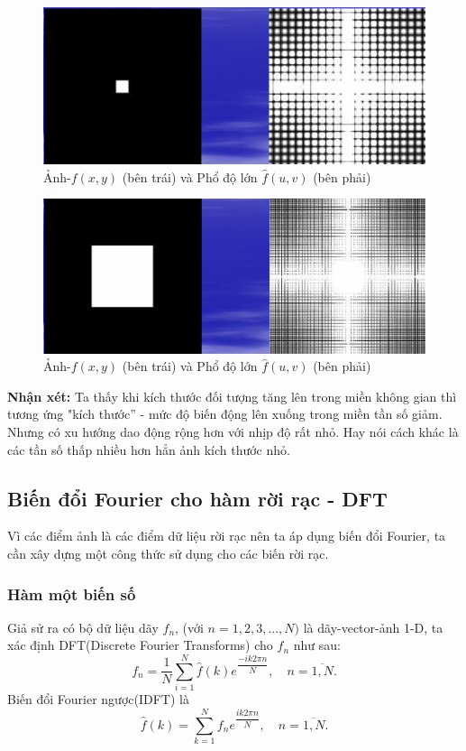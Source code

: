 \documentclass[12pt,a4paper]{report}
\numberwithin{equation}{section}
\theoremstyle{definition} %
\begin{document}
		  \begin{figure}[H]
			\centering
			\includegraphics[width = 0.8\linewidth]{img/anhVaphodolon3.png}
			\caption{Ảnh-$f(x,y)$ (bên trái) và Phổ độ lớn $\hat{f}(u,v)$ (bên phải)}
			\label{fig17}
		 \end{figure}
		  \begin{figure}[H]
			\centering
			\includegraphics[width = 0.8\linewidth]{img/anhVaphodolon4.png}
			\caption{Ảnh-$f(x,y)$ (bên trái) và Phổ độ lớn $\hat{f}(u,v)$ (bên phải)}
			\label{fig18}
		 \end{figure}

		 \textbf{Nhận xét:} Ta thấy khi kích thước đối tượng tăng lên trong miền không gian thì tương ứng "kích thước'' - mức độ biến động lên xuống trong miền tần số giảm. Nhưng có xu hướng dao động rộng hơn với nhịp độ rất nhỏ. Hay nói cách khác là các tần số thấp nhiều hơn hẳn ảnh kích thước nhỏ.


\subsection{Biến đổi Fourier cho hàm rời rạc - DFT}

Vì các điểm ảnh là các điểm dữ liệu rời rạc nên ta áp dụng biến đổi Fourier, ta cần xây dựng một công thức sử dụng cho các biến rời rạc.

\subsubsection{Hàm một biến số}

Giả sử ra có bộ dữ liệu dãy $f_n$, (với $n= 1,2,3,...,N)$ là dãy-vector-ảnh 1-D, ta xác định DFT(Discrete Fourier Transforms) cho $f_n$ như sau: 
\begin{equation}
	\label{144}
    f_n= \dfrac{1}{N}\sum_{i=1}^N\hat{f}(k)e^{\dfrac{-ik2\pi n}{N}},\quad n=\overline{1,N}.
\end{equation}
Biến đổi Fourier ngược(IDFT) là
\begin{equation}
	\label{145}
    \hat{f}(k) =\sum_{k=1}^Nf_ne^{\dfrac{ik2\pi n}{N}},\quad n=\overline{1,N}.
\end{equation}
\end{document}
